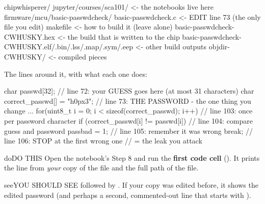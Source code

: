 \documentclass[11pt,letterpaper]{article}
\begin{document}
\vspace{4pt}

\begin{guidecode}
chipwhisperer/
  jupyter/courses/sca101/                 <- the notebooks live here
  firmware/mcu/basic-passwdcheck/
      basic-passwdcheck.c                 <- EDIT line 73 (the only file you edit)
      makefile                            <- how to build it (leave alone)
      basic-passwdcheck-CWHUSKY.hex       <- the build that is written to the chip
      basic-passwdcheck-CWHUSKY.elf/.bin/.lss/.map/.sym/.eep   <- other build outputs
      objdir-CWHUSKY/                     <- compiled pieces
\end{guidecode}

The lines around it, with what each one does:

\begin{guidecode}
char passwd[32];                    // line 72: your GUESS goes here (at most 31 characters)
char correct_passwd[] = "h0px3";    // line 73: THE PASSWORD - the one thing you change
...
for(uint8_t i = 0; i < sizeof(correct_passwd); i++){   // line 103: once per password character
    if (correct_passwd[i] != passwd[i]){               // line 104: compare guess and password
        passbad = 1;                                   // line 105: remember it was wrong
        break;                                         // line 106: STOP at the first wrong one
    }                                                  //           = the leak you attack
}
\end{guidecode}

\begin{guidecallout}{do}{DO THIS}
Open the notebook's Step 8 and run the \textbf{first code cell} (). It prints the line
from \emph{your} copy of the file and the full path of the file.
\end{guidecallout}

\begin{guidecallout}{see}{YOU SHOULD SEE}
  followed by .
If your copy was edited before, it shows the edited password (and perhaps a second, commented-out line that starts
with \code{//}).
\end{guidecallout}

\end{document}
